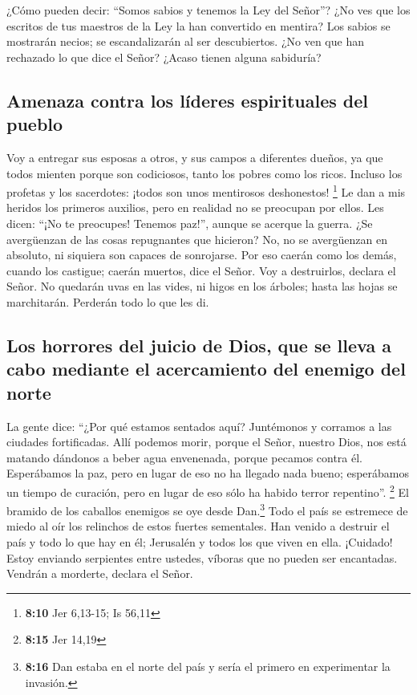 ¿Cómo pueden decir: ``Somos sabios y tenemos la Ley del
Señor''? ¿No ves que los escritos de tus maestros de la Ley la han
convertido en mentira?  Los sabios se mostrarán necios; se
escandalizarán al ser descubiertos. ¿No ven que han rechazado lo que
dice el Señor? ¿Acaso tienen alguna sabiduría?

\hypertarget{amenaza-contra-los-luxedderes-espirituales-del-pueblo}{%
\subsection{Amenaza contra los líderes espirituales del
pueblo}\label{amenaza-contra-los-luxedderes-espirituales-del-pueblo}}

 Voy a entregar sus esposas a otros, y sus campos a
diferentes dueños, ya que todos mienten porque son codiciosos, tanto los
pobres como los ricos. Incluso los profetas y los sacerdotes: ¡todos son
unos mentirosos deshonestos! \footnote{\textbf{8:10} Jer 6,13-15; Is
  56,11}  Le dan a mis heridos los primeros auxilios,
pero en realidad no se preocupan por ellos. Les dicen: ``¡No te
preocupes! Tenemos paz!'', aunque se acerque la guerra. 
¿Se avergüenzan de las cosas repugnantes que hicieron? No, no se
avergüenzan en absoluto, ni siquiera son capaces de sonrojarse. Por eso
caerán como los demás, cuando los castigue; caerán muertos, dice el
Señor.  Voy a destruirlos, declara el Señor. No quedarán
uvas en las vides, ni higos en los árboles; hasta las hojas se
marchitarán. Perderán todo lo que les di.

\hypertarget{los-horrores-del-juicio-de-dios-que-se-lleva-a-cabo-mediante-el-acercamiento-del-enemigo-del-norte}{%
\subsection{Los horrores del juicio de Dios, que se lleva a cabo
mediante el acercamiento del enemigo del
norte}\label{los-horrores-del-juicio-de-dios-que-se-lleva-a-cabo-mediante-el-acercamiento-del-enemigo-del-norte}}

 La gente dice: ``¿Por qué estamos sentados aquí?
Juntémonos y corramos a las ciudades fortificadas. Allí podemos morir,
porque el Señor, nuestro Dios, nos está matando dándonos a beber agua
envenenada, porque pecamos contra él.  Esperábamos la
paz, pero en lugar de eso no ha llegado nada bueno; esperábamos un
tiempo de curación, pero en lugar de eso sólo ha habido terror
repentino''. \footnote{\textbf{8:15} Jer 14,19}  El
bramido de los caballos enemigos se oye desde Dan.\footnote{\textbf{8:16}
  Dan estaba en el norte del país y sería el primero en experimentar la
  invasión.} Todo el país se estremece de miedo al oír los relinchos de
estos fuertes sementales. Han venido a destruir el país y todo lo que
hay en él; Jerusalén y todos los que viven en ella. 
¡Cuidado! Estoy enviando serpientes entre ustedes, víboras que no pueden
ser encantadas. Vendrán a morderte, declara el Señor.

